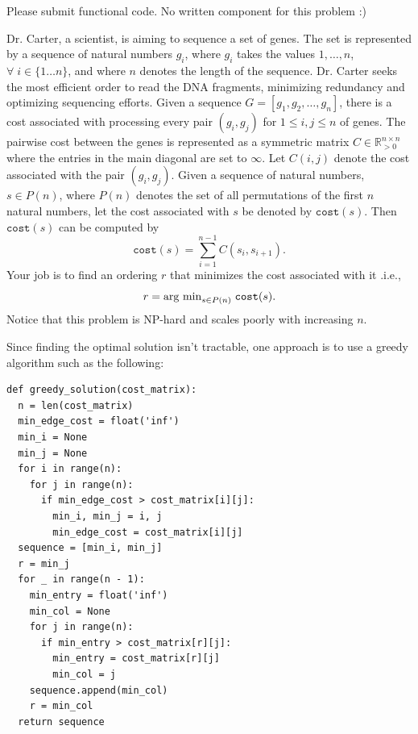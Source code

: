 \documentclass{hw}
\begin{document}
\begin{solution}
    Please submit functional code. No written component for this problem :)
\end{solution}

\newpage

\begin{problem}
Dr. Carter, a scientist, is aiming to sequence a set of genes. The set is represented by a sequence of natural numbers $g_i$, where $g_i$ takes the values $1,\dots, n$,  $\forall \; i \in \{1 \dots n\}$, and where $n$ denotes the length of the sequence. Dr. Carter seeks the most efficient order to read the DNA fragments, minimizing redundancy and optimizing sequencing efforts.
Given a sequence $G = [g_1, g_2, \dots, g_n]$, there is a cost associated with processing every pair $(g_i, g_{j})$ for $1 \leq i, j \leq n$ of genes. The pairwise cost between the genes is represented as a symmetric matrix $C \in \mathbb{R}_{> 0}^{n \times n}$ where the entries in the main diagonal are set to $\infty$. Let $C(i, j)$ denote the cost associated with the pair $(g_i, g_j)$. Given a sequence of natural numbers, $s \in P(n)$, where $P(n)$ denotes the set of all permutations of the first $n$ natural numbers, let the cost associated with $s$ be denoted by $\texttt{cost}(s)$. Then $\texttt{cost}(s)$ can be computed by $$\texttt{cost}(s) = \sum_{i=1}^{n - 1} C(s_i, s_{i+1}).$$
Your job is to find an ordering $r$ that minimizes the cost associated with it .i.e.,
$$r = \textnormal{arg min}_{s \in  P(n)}\; \texttt{cost}(s).$$
Notice that this problem is NP-hard and scales poorly with increasing $n$. 



\begin{subproblem}
Since finding the optimal solution isn't tractable, one approach is to use a greedy algorithm such as the following:

\begin{lstlisting}
def greedy_solution(cost_matrix):
  n = len(cost_matrix)
  min_edge_cost = float('inf')
  min_i = None
  min_j = None
  for i in range(n):
    for j in range(n):
      if min_edge_cost > cost_matrix[i][j]:
        min_i, min_j = i, j
        min_edge_cost = cost_matrix[i][j]
  sequence = [min_i, min_j]
  r = min_j
  for _ in range(n - 1):
    min_entry = float('inf')
    min_col = None
    for j in range(n):
      if min_entry > cost_matrix[r][j]:
        min_entry = cost_matrix[r][j]
        min_col = j
    sequence.append(min_col)
    r = min_col
  return sequence
\end{lstlisting}


\end{subproblem}
\end{problem}
\end{document}
